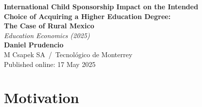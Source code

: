 \documentclass[aspectratio=169, 10pt]{beamer}
\begin{document}
\begin{frame}[plain]
  \vspace{1.5em}
  \begin{center}
    {\color{navyblue}\Large\bfseries
      International Child Sponsorship Impact on the Intended\\[0.3em]
      Choice of Acquiring a Higher Education Degree:\\[0.3em]
      The Case of Rural Mexico}\\[1em]
    {\color{institutgold}\large\itshape Education Economics (2025)}\\[1.5em]
    {\color{navyblue}\normalsize\bfseries Daniel Prudencio}\\[0.3em]
    {\color{medgray}\small M Csapek SA \,/\, Tecnológico de Monterrey}\\[1.5em]
    {\color{institutgold}\small Published online: 17 May 2025}
  \end{center}
\end{frame}

\section{Motivation}
\end{document}
